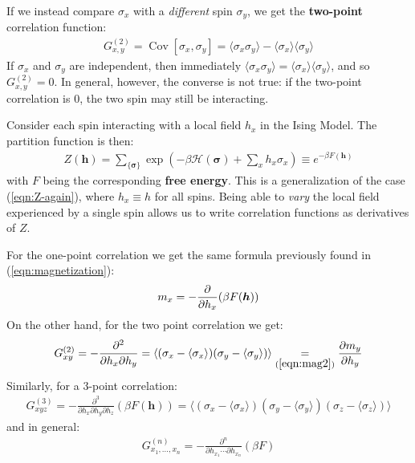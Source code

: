 \documentclass[../template.tex]{subfiles}
\begin{document}
\medskip

If we instead compare $\sigma_x$ with a \textit{different} spin $\sigma_y$, we get the \textbf{two-point} correlation function:
\begin{align}\label{eqn:two-point}
    G_{x,y}^{(2)} = \operatorname{Cov}[\sigma_x, \sigma_y] = \langle \sigma_x \sigma_y \rangle - \langle \sigma_x \rangle \langle \sigma_y \rangle
\end{align}   
If $\sigma_x$ and $\sigma_y$ are independent, then immediately $\langle \sigma_x \sigma_y \rangle = \langle \sigma_x \rangle \langle \sigma_y \rangle$, and so $G_{x,y}^{(2)} = 0$. In general, however, the converse is not true: if the two-point correlation is $0$, the two spin may still be interacting.

\medskip

Consider each spin interacting with a local field $h_x$ in the Ising Model. The partition function is then:
\begin{align*}
    Z(\bm{h}) = \sum_{\{\bm{\sigma}\}} \exp\left(-\beta \mathcal{H}(\bm{\sigma}) + \sum_x h_x \sigma_x \right) \equiv e^{-\beta F(\bm{h})}
\end{align*}
with $F$ being the corresponding \textbf{free energy}. This is a generalization of the case (\ref{eqn:Z-again}), where $h_x \equiv h$ for all spins. Being able to \textit{vary} the local field experienced by a single spin allows us to write correlation functions as derivatives of $Z$. 

\medskip

For the one-point correlation we get the same formula previously found in (\ref{eqn:magnetization}):
\begin{align}\label{eqn:mag2}
    m_x = -\pdv{h_x} (\beta F(\bm{h}))
\end{align}
On the other hand, for the two point correlation we get:
\begin{align}\label{eqn:G2}
    G_{xy}^{(2)} = -\pdv[2]{}{h_x}{h_y} (\beta F(\bm{h})) = \langle (\sigma_x - \langle \sigma_x \rangle) (\sigma_y - \langle \sigma_y \rangle)\rangle \underset{(\ref{eqn:mag2})}{=}  \pdv{m_y}{h_y}
\end{align}
Similarly, for a $3$-point correlation:
\begin{align*}
    G_{xyz}^{(3)} = -\frac{\partial^3}{\partial h_x \partial h_y \partial h_z} (\beta F(\bm{h})) = \langle (\sigma_x - \langle \sigma_x \rangle) (\sigma_y - \langle \sigma_y \rangle) (\sigma_z - \langle \sigma_z \rangle) \rangle 
\end{align*}
and in general:
\begin{align*}
    G_{x_1,\dots,x_n}^{(n)} = - \frac{\partial^n}{\partial h_{x_1}\cdots \partial h_{x_n}}  (\beta F)
\end{align*}
\end{document}
